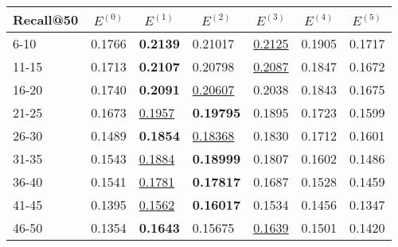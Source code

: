 \begin{table*}[]
    \begin{tabular}{|l|l|l|l|l|l|l|}
    \hline
    Recall@50 & \multicolumn{1}{c|}{$E^{(0)}$} & \multicolumn{1}{c|}{$E^{(1)}$} & \multicolumn{1}{c|}{$E^{(2)}$} & \multicolumn{1}{c|}{$E^{(3)}$} & \multicolumn{1}{c|}{$E^{(4)}$} & \multicolumn{1}{c|}{$E^{(5)}$} \\ \hline
    6-10      & 0.1766                         & \textbf{0.2139}                & 0.21017                        & \underline{0.2125}             & 0.1905                         & 0.1717                         \\ \hline
    11-15     & 0.1713                         & \textbf{0.2107}                & 0.20798                        & \underline{0.2087}             & 0.1847                         & 0.1672                         \\ \hline
    16-20     & 0.1740                         & \textbf{0.2091}                & \underline{0.20607}            & 0.2038                         & 0.1843                         & 0.1675                         \\ \hline
    21-25     & 0.1673                         & \underline{0.1957}             & \textbf{0.19795}               & 0.1895                         & 0.1723                         & 0.1599                         \\ \hline
    26-30     & 0.1489                         & \textbf{0.1854}                & \underline{0.18368}            & 0.1830                         & 0.1712                         & 0.1601                         \\ \hline
    31-35     & 0.1543                         & \underline{0.1884}             & \textbf{0.18999}               & 0.1807                         & 0.1602                         & 0.1486                         \\ \hline
    36-40     & 0.1541                         & \underline{0.1781}             & \textbf{0.17817}               & 0.1687                         & 0.1528                         & 0.1459                         \\ \hline
    41-45     & 0.1395                         & \underline{0.1562}             & \textbf{0.16017}               & 0.1534                         & 0.1456                         & 0.1347                         \\ \hline
    46-50     & 0.1354                         & \textbf{0.1643}                & 0.15675                        & \underline{0.1639}             & 0.1501                         & 0.1420                         \\ \hline

\end{tabular}
\end{table*}
